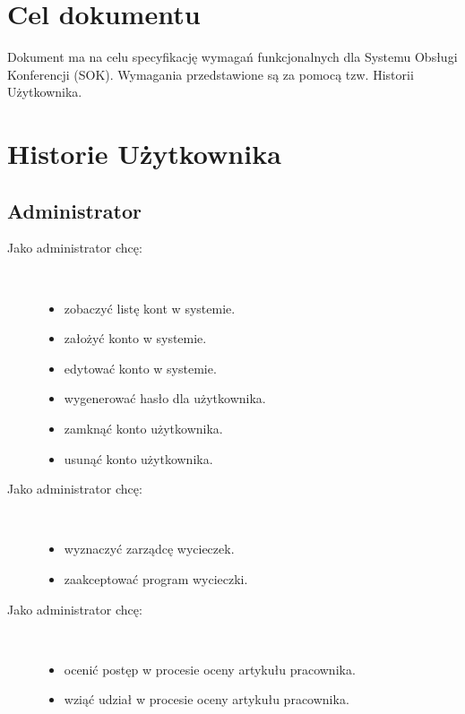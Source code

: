 \section{Cel dokumentu}
\suppressfloats[t]

Dokument ma na celu specyfikację wymagań funkcjonalnych dla Systemu Obsługi Konferencji (SOK). Wymagania przedstawione są za pomocą tzw. Historii Użytkownika.


\section{Historie Użytkownika}

\subsection{Administrator}

\begin{description}
  \item[Jako administrator chcę:] \hfill \\
  \begin{itemize}
    \item zobaczyć listę kont w systemie.\\
    \item założyć konto w systemie.\\
    \item edytować konto w systemie.\\
    \item wygenerować hasło dla użytkownika.\\
    \item zamknąć konto użytkownika.\\
    \item usunąć konto użytkownika.\\
  \end{itemize}

  \item[Jako administrator chcę:] \hfill \\
  \begin{itemize}
    \item wyznaczyć zarządcę wycieczek.\\
    \item zaakceptować program wycieczki.\\
  \end{itemize}

  \item[Jako administrator chcę:] \hfill \\
  \begin{itemize}
    \item ocenić postęp w procesie oceny artykułu pracownika.\\
    \item wziąć udział w procesie oceny artykułu pracownika.\\
  \end{itemize}

\end{description}




